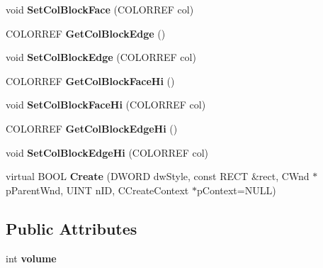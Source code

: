 \begin{DoxyCompactItemize}
\item 
\hypertarget{class_cx_prog_ctrl_a3515b4da7278bc35e840be37e346a524}{void {\bfseries Set\-Col\-Block\-Face} (C\-O\-L\-O\-R\-R\-E\-F col)}\label{class_cx_prog_ctrl_a3515b4da7278bc35e840be37e346a524}

\item 
\hypertarget{class_cx_prog_ctrl_ab1c04bac764227e6b26ccb495089718f}{C\-O\-L\-O\-R\-R\-E\-F {\bfseries Get\-Col\-Block\-Edge} ()}\label{class_cx_prog_ctrl_ab1c04bac764227e6b26ccb495089718f}

\item 
\hypertarget{class_cx_prog_ctrl_a53538ac4339903083c1a123769546c10}{void {\bfseries Set\-Col\-Block\-Edge} (C\-O\-L\-O\-R\-R\-E\-F col)}\label{class_cx_prog_ctrl_a53538ac4339903083c1a123769546c10}

\item 
\hypertarget{class_cx_prog_ctrl_a5f6995166272696b14a6c0f9964902da}{C\-O\-L\-O\-R\-R\-E\-F {\bfseries Get\-Col\-Block\-Face\-Hi} ()}\label{class_cx_prog_ctrl_a5f6995166272696b14a6c0f9964902da}

\item 
\hypertarget{class_cx_prog_ctrl_a639e26a77ab013c989346cd337b79acc}{void {\bfseries Set\-Col\-Block\-Face\-Hi} (C\-O\-L\-O\-R\-R\-E\-F col)}\label{class_cx_prog_ctrl_a639e26a77ab013c989346cd337b79acc}

\item 
\hypertarget{class_cx_prog_ctrl_ae746e716f7f2df01072a9eac81349546}{C\-O\-L\-O\-R\-R\-E\-F {\bfseries Get\-Col\-Block\-Edge\-Hi} ()}\label{class_cx_prog_ctrl_ae746e716f7f2df01072a9eac81349546}

\item 
\hypertarget{class_cx_prog_ctrl_a1e4a3ae4c0925bd06b8075edf2e5a89e}{void {\bfseries Set\-Col\-Block\-Edge\-Hi} (C\-O\-L\-O\-R\-R\-E\-F col)}\label{class_cx_prog_ctrl_a1e4a3ae4c0925bd06b8075edf2e5a89e}

\item 
\hypertarget{class_cx_prog_ctrl_a6892384d518bbfc1340e25b8324fb1b9}{virtual B\-O\-O\-L {\bfseries Create} (D\-W\-O\-R\-D dw\-Style, const R\-E\-C\-T \&rect, C\-Wnd $\ast$p\-Parent\-Wnd, U\-I\-N\-T n\-I\-D, C\-Create\-Context $\ast$p\-Context=N\-U\-L\-L)}\label{class_cx_prog_ctrl_a6892384d518bbfc1340e25b8324fb1b9}

\end{DoxyCompactItemize}
\subsection*{Public Attributes}
\begin{DoxyCompactItemize}
\item 
\hypertarget{class_cx_prog_ctrl_a33f7c8fc272767eb36d762d751b2d676}{int {\bfseries volume}}\label{class_cx_prog_ctrl_a33f7c8fc272767eb36d762d751b2d676}

\end{DoxyCompactItemize}

